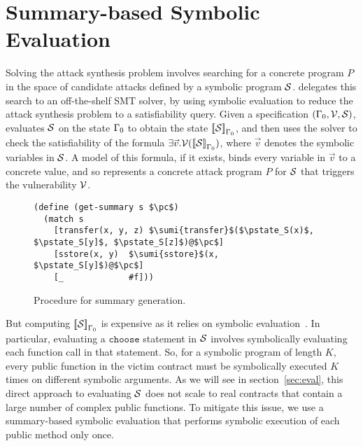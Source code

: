 \section{Summary-based Symbolic Evaluation}\label{sec:sum}

Solving the attack synthesis problem involves searching for a concrete program
$P$ in the space of candidate attacks defined by a symbolic program $\mathcal{S}$.
\toolname delegates this search to an off-the-shelf SMT solver, by using
symbolic evaluation to reduce the attack synthesis problem to a satisfiability
query. Given a specification  $(\Gamma_0, \mathcal{V}, \mathcal{S})$,  \toolname
evaluates $\mathcal{S}$ on the state $\Gamma_0$ to obtain the state
${[\![\mathcal{S}]\!]}_{\Gamma_0}$, and then uses the solver to check the
satisfiability of the  formula $\exists \vec{v} .
\mathcal{V}({[\![\mathcal{S}]\!]}_{\Gamma_0})$, where $\vec{v}$ denotes the
symbolic variables in $\mathcal{S}$. A model of this formula, if it exists, binds
every variable in $\vec{v}$ to a concrete value, and so represents a concrete
attack program $P$ for $\mathcal{S}$ that triggers the vulnerability
$\mathcal{V}$.
\begin{figure}[!t]
    \centering
  \begin{minipage}{0.5\linewidth}
\begin{lstlisting}[linewidth=8cm] 
(define (get-summary s $\pc$)
  (match s
    [transfer(x, y, z) $\sumi{transfer}$($\pstate_S(x)$, $\pstate_S[y]$, $\pstate_S[z]$)@$\pc$]
    [sstore(x, y)  $\sumi{sstore}$(x, $\pstate_S[y]$)@$\pc$]
    [_             #f]))
		\end{lstlisting}
		\end{minipage}
		\vspace{-0.1in}
    \caption{Procedure for summary generation. }
    \vspace{-0.1in}
      \label{fig:sum-gen}
\end{figure}
But computing ${[\![\mathcal{S}]\!]}_{\Gamma_0}$ is expensive as it relies on
symbolic evaluation~\cite{rosette}. In particular, evaluating a
$\mathtt{choose}$ statement in $\mathcal{S}$ involves symbolically evaluating each
function call in that statement. So, for a symbolic program of length $K$, every
public function in the victim contract must be symbolically executed $K$ times
on different symbolic arguments. As we will see in section~\ref{sec:eval}, this
direct approach to evaluating $\mathcal{S}$ does not scale to real contracts that
contain a large number of complex public functions. To mitigate this issue, we
use a summary-based symbolic evaluation that performs symbolic execution of each
public method only once. 

